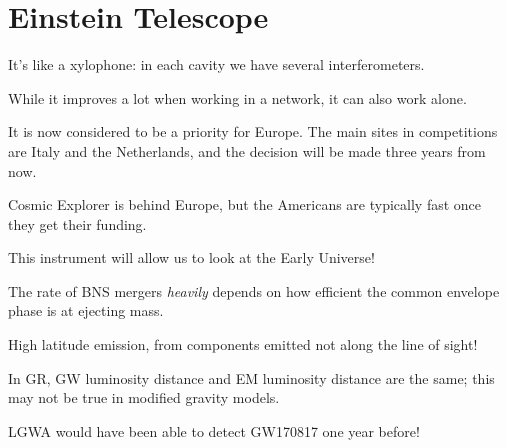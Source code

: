 \documentclass[main.tex]{subfiles}
\begin{document}
\section{Einstein Telescope}


It's like a xylophone: in each cavity we have several interferometers. 

While it improves a lot when working in a network, 
it can also work alone. 

It is now considered to be a priority for Europe. 
The main sites in competitions are Italy and the Netherlands, and the decision
will be made three years from now. 

Cosmic Explorer is behind Europe, but the Americans are typically fast once
they get their funding. 

This instrument will allow us to look at the Early Universe! 

The rate of BNS mergers \emph{heavily} depends on how efficient the common envelope
phase is at ejecting mass. 

High latitude emission, from components emitted not along the line of sight! 

In GR, GW luminosity distance and EM luminosity distance are the same; 
this may not be true in modified gravity models. 


LGWA would have been able to detect GW170817 one year before!
\end{document}
